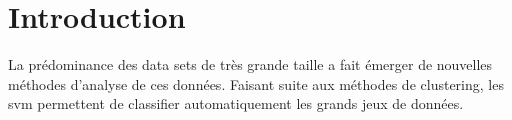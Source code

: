 \section{Introduction}

La prédominance des data sets de très grande taille
a fait émerger de nouvelles méthodes d’analyse de ces données.
Faisant suite aux méthodes de clustering, les \gls{svm}
permettent de classifier automatiquement les grands jeux de données.

\pagebreak
